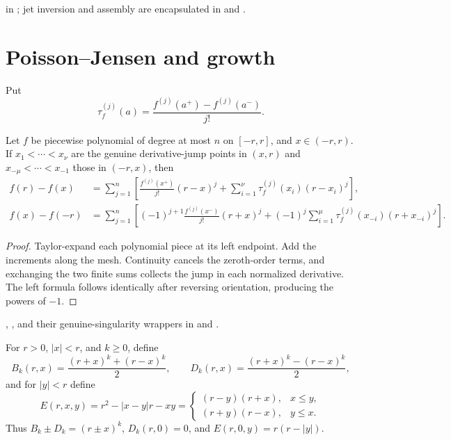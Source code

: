 \begin{leanproof}
 in
; jet inversion and assembly are
encapsulated in  and .
\end{leanproof}

\section{Poisson--Jensen and growth}

Put
\[
 \tau_f^{(j)}(a)=\frac{f^{(j)}(a^+)-f^{(j)}(a^-)}{j!}.
\]

\begin{lemma}
\leanok
{}
Let $f$ be piecewise polynomial of degree at most $n$ on $[-r,r]$, and
$x\in(-r,r)$.  If $x_1<\cdots<x_\nu$ are the genuine derivative-jump points
in $(x,r)$ and $x_{-\mu}<\cdots<x_{-1}$ those in $(-r,x)$, then
\begin{align*}
 f(r)-f(x)
 &=\sum_{j=1}^n\left[
   \frac{f^{(j)}(x^+)}{j!}(r-x)^j
   +\sum_{i=1}^\nu\tau_f^{(j)}(x_i)(r-x_i)^j\right],\\
 f(x)-f(-r)
 &=\sum_{j=1}^n\left[
   (-1)^{j+1}\frac{f^{(j)}(x^-)}{j!}(r+x)^j
   +(-1)^j\sum_{i=1}^\mu\tau_f^{(j)}(x_{-i})(r+x_{-i})^j\right].
\end{align*}
\end{lemma}

\begin{proof}
\leanok
Taylor-expand each polynomial piece at its left endpoint.  Add the increments
along the mesh.  Continuity cancels the zeroth-order terms, and exchanging the
two finite sums collects the jump in each normalized derivative.  The left
formula follows identically after reversing orientation, producing the powers
of $-1$.
\end{proof}

\begin{leanproof}
, , and their
genuine-singularity wrappers in  and
.
\end{leanproof}

\begin{definition}
\leanok
For $r>0$, $|x|<r$, and $k\geq0$, define
\[
 B_k(r,x)=\frac{(r+x)^k+(r-x)^k}{2},\qquad
 D_k(r,x)=\frac{(r+x)^k-(r-x)^k}{2},
\]
and for $|y|<r$ define
\[
 E(r,x,y)=r^2-|x-y|r-xy
 =\begin{cases}(r-y)(r+x),&x\leq y,\\
                 (r+y)(r-x),&y\leq x.
   \end{cases}
\]
Thus $B_k\pm D_k=(r\pm x)^k$, $D_k(r,0)=0$, and
$E(r,0,y)=r(r-|y|)$.
\end{definition}

